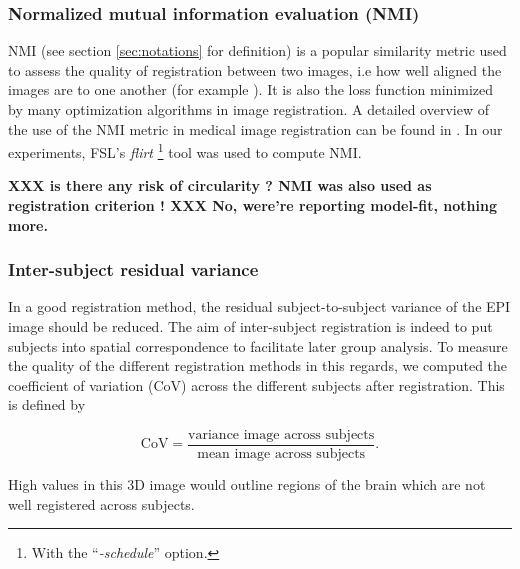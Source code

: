 
\subsubsection{Normalized mutual information evaluation (NMI)}
NMI (see section \ref{sec:notations} for definition) is a
popular similarity metric used to assess the quality of
registration between two images, i.e how well aligned the images are to one another
(for example \citep{maes1997multimodality}). It is also the loss function minimized by many
optimization algorithms in image registration.
A detailed overview of
the use of the NMI metric in medical image registration can be found
in \citep{pluim2003}.
In our experiments, FSL's \textit{flirt} \footnote{With the
   ``\textit{-schedule}'' option.}
tool \citep{smith2004} was used to compute NMI. 

\textbf{XXX is there any risk of circularity ? NMI was also used as registration criterion !
XXX No, were're reporting model-fit, nothing more.}



\subsubsection{Inter-subject residual variance}
In a good registration method, the residual subject-to-subject
variance of the EPI image should be reduced. The aim of
inter-subject registration is indeed to put subjects into spatial
correspondence to facilitate later group analysis. To measure the quality of
the different registration methods in this regards, we computed the
coefficient of variation (CoV) across the different subjects after registration.
This is defined by

\begin{equation}
  \text{CoV} = \frac{\text{variance image across subjects}}{\text{mean image across subjects}}.
\end{equation}

High values in this 3D image would outline regions of the brain which are not well registered across subjects.

